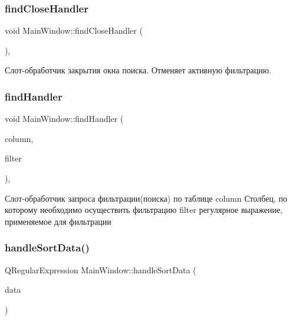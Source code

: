\subsubsection{\texorpdfstring{findCloseHandler}{findCloseHandler}}
{\footnotesize\ttfamily void Main\+Window\+::find\+Close\+Handler (\begin{DoxyParamCaption}{ }\end{DoxyParamCaption})\hspace{0.3cm}{\ttfamily [private]}, {\ttfamily [slot]}}

Слот-\/обработчик закрытия окна поиска. Отменяет активную фильтрацию. \mbox{\label{class_main_window_a3db67e0fc35329311fdc19a52988bdd0}} 
\subsubsection{\texorpdfstring{findHandler}{findHandler}}
{\footnotesize\ttfamily void Main\+Window\+::find\+Handler (\begin{DoxyParamCaption}\item[{int}]{column,  }\item[{const Q\+String \&}]{filter }\end{DoxyParamCaption})\hspace{0.3cm}{\ttfamily [private]}, {\ttfamily [slot]}}

Слот-\/обработчик запроса фильтрации(поиска) по таблице column Столбец, по которому необходимо осуществить фильтрацию filter регулярное выражение, применяемое для фильтрации \mbox{\label{class_main_window_a41ae3989f10eb69553361456a3eab9c8}} 
\subsubsection{\texorpdfstring{handleSortData()}{handleSortData()}}
{\footnotesize\ttfamily Q\+Regular\+Expression Main\+Window\+::handle\+Sort\+Data (\begin{DoxyParamCaption}\item[{const Q\+String \&}]{data }\end{DoxyParamCaption})\hspace{0.3cm}{\ttfamily [private]}}

